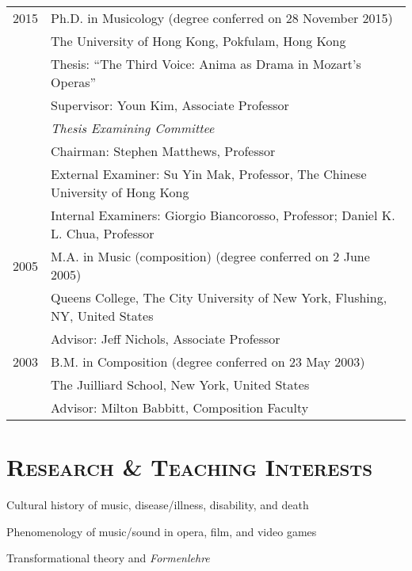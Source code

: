 \documentclass[a4paper,11pt,draft]{article}
\begin{document}
  \hspace*{-0.25cm}
  \begin{tabular}{p{2.5cm} l}
    2015 & Ph.D. in Musicology (degree conferred on 28 November 2015)\\
    & The University of Hong Kong, Pokfulam, Hong Kong\\
    & Thesis: ``The Third Voice: Anima as Drama in Mozart's Operas''\\
    & Supervisor: Youn Kim, Associate Professor\\[2mm]
    & \textit{Thesis Examining Committee}\\
    & Chairman: Stephen Matthews, Professor\\
    & External Examiner: Su Yin Mak, Professor, The Chinese University of Hong Kong\\
    & Internal Examiners: Giorgio Biancorosso, Professor; Daniel K. L. Chua, Professor\\[2mm]
    
	2005 & M.A. in Music (composition) (degree conferred on 2 June 2005)\\
    & Queens College, The City University of New York, Flushing, NY, United
    States\\
	& Advisor: Jeff Nichols, Associate Professor\\[2mm]

    2003 & B.M. in Composition (degree conferred on 23 May 2003)\\
    & The Juilliard School, New York, United States\\
    & Advisor: Milton Babbitt, Composition Faculty
  \end{tabular}
  
  \vspace{5mm}
  
  \section*{\textsc{Research \& Teaching Interests}}
  
  \noindent \hspace{2mm} \textbullet \hspace{2mm} Cultural history of music, disease/illness, disability, and death
  
  \noindent \hspace{2mm} \textbullet \hspace{2mm} Phenomenology of music/sound in opera, film, and video games
  
  \noindent \hspace{2mm} \textbullet \hspace{2mm} Transformational theory and \textit{Formenlehre}
  
\end{document}
